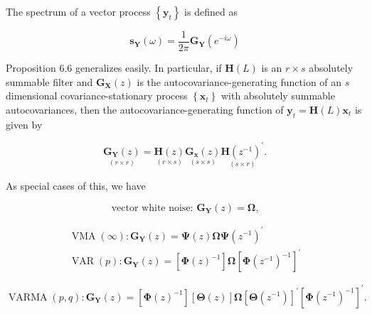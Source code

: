 \documentclass[10pt]{article}
\begin{document}
The spectrum of a vector process $\left\{\mathbf{y}_{t}\right\}$ is defined as


\begin{equation*}
\mathbf{s}_{\mathbf{Y}}(\omega)=\frac{1}{2 \pi} \mathbf{G}_{\mathbf{Y}}\left(e^{-i \omega}\right) \tag{6.3.12}
\end{equation*}


Proposition 6.6 generalizes easily. In particular, if $\mathbf{H}(L)$ is an $r \times s$ absolutely summable filter and $\mathbf{G}_{\mathbf{X}}(z)$ is the autocovariance-generating function of an $s$ dimensional covariance-stationary process $\left\{\mathbf{x}_{t}\right\}$ with absolutely summable autocovariances, then the autocovariance-generating function of $\mathbf{y}_{t}=\mathbf{H}(L) \mathbf{x}_{t}$ is given by


\begin{equation*}
\underset{(r \times r)}{\mathbf{G}_{\mathbf{Y}}(z)}=\underset{(r \times s)}{\mathbf{H}(z)} \underset{(s \times s)}{\mathbf{G}_{\mathbf{x}}(z)} \underset{(s \times r)}{\mathbf{H}\left(z^{-1}\right)^{\prime}} . \tag{6.3.13}
\end{equation*}


As special cases of this, we have


\begin{equation*}
\text { vector white noise: } \mathbf{G}_{\mathbf{Y}}(z)=\boldsymbol{\Omega} \text {, } \tag{6.3.14}
\end{equation*}



\begin{gather*}
\operatorname{VMA}(\infty): \mathbf{G}_{\mathbf{Y}}(z)=\boldsymbol{\Psi}(z) \boldsymbol{\Omega} \boldsymbol{\Psi}\left(z^{-1}\right)^{\prime}  \tag{6.3.15}\\
\operatorname{VAR}(p): \mathbf{G}_{\mathbf{Y}}(z)=\left[\boldsymbol{\Phi}(z)^{-1}\right] \boldsymbol{\Omega}\left[\boldsymbol{\Phi}\left(z^{-1}\right)^{-1}\right]^{\prime} \tag{6.3.16}
\end{gather*}



\begin{equation*}
\operatorname{VARMA}(p, q): \mathbf{G}_{\mathbf{Y}}(z)=\left[\boldsymbol{\Phi}(z)^{-1}\right][\boldsymbol{\Theta}(z)] \boldsymbol{\Omega}\left[\boldsymbol{\Theta}\left(z^{-1}\right)\right]^{\prime}\left[\boldsymbol{\Phi}\left(z^{-1}\right)^{-1}\right]^{\prime} . \tag{6.3.17}
\end{equation*}
\end{document}
